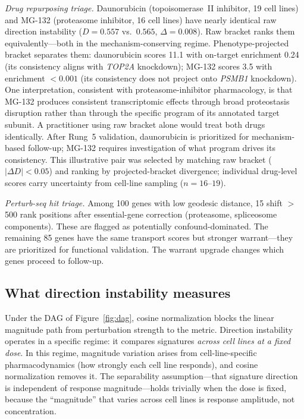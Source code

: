 \documentclass[11pt]{article}
\begin{document}
\emph{Drug repurposing triage.} Daunorubicin (topoisomerase~II inhibitor,
19 cell lines) and MG-132 (proteasome inhibitor, 16 cell lines) have
nearly identical raw direction instability ($D = 0.557$ vs.\ $0.565$,
$\Delta = 0.008$). Raw bracket ranks them equivalently---both in the
mechanism-conserving regime. Phenotype-projected bracket separates them:
daunorubicin scores 11.1 with on-target enrichment 0.24 (its consistency
aligns with \emph{TOP2A} knockdown); MG-132 scores 3.5 with enrichment
$< 0.001$ (its consistency does not project onto \emph{PSMB1} knockdown).
One interpretation, consistent with proteasome-inhibitor pharmacology, is
that MG-132 produces consistent transcriptomic effects through broad
proteostasis disruption rather than through the specific program of its
annotated target subunit. A practitioner using raw bracket alone would
treat both drugs identically. After Rung~5 validation, daunorubicin is
prioritized for mechanism-based follow-up; MG-132 requires investigation
of what program drives its consistency. This illustrative pair was selected
by matching raw bracket ($|\Delta D| < 0.05$) and ranking by projected-bracket
divergence; individual drug-level scores carry uncertainty from cell-line
sampling ($n = 16$--$19$).

\emph{Perturb-seq hit triage.} Among 100 genes with low geodesic
distance, 15 shift $>$500 rank positions after essential-gene correction
(proteasome, spliceosome components). These are flagged as potentially
confound-dominated. The remaining 85 genes have the same transport
scores but stronger warrant---they are prioritized for functional
validation. The warrant upgrade changes which genes proceed to follow-up.

\subsection{What direction instability measures}

Under the DAG of Figure~\ref{fig:dag}, cosine normalization blocks the
linear magnitude path from perturbation strength to the metric. Direction
instability operates in a specific regime: it compares signatures
\emph{across cell lines at a fixed dose}. In this regime, magnitude
variation arises from cell-line-specific pharmacodynamics (how strongly
each cell line responds), and cosine normalization removes it. The
separability assumption---that signature direction is independent of
response magnitude---holds trivially when the dose is fixed, because
the ``magnitude'' that varies across cell lines is response amplitude,
not concentration.
\end{document}
